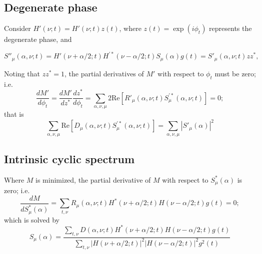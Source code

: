 \documentclass[manuscript]{aastex631}
\begin{document}


\subsection{Degenerate phase}
\label{sec:degenerate_phase}

\noindent

Consider $H'(\nu;t) = H'(\nu;t) z(t)$, where $z(t)=\exp(i\phi_t)$ represents the degenerate phase, and

\begin{equation}
    S''_\mu(\alpha,\nu;t) = H'(\nu+\alpha/2;t) H^{\prime *}(\nu-\alpha/2;t) S_\mu(\alpha) g(t) = S'_\mu(\alpha,\nu;t) zz^*,
\end{equation}

Noting that $zz^*=1$, the partial derivatives of $M'$ with respect to $\phi_t$ must be zero; i.e.
\begin{equation}
    \frac{dM'}{d\phi_t} = \frac{dM'}{dz^*}\frac{dz^*}{d\phi_t}
    = \sum_{\alpha,\nu,\mu} 2\mathrm{Re} \left[
    R'_\mu(\alpha,\nu;t) S^{\prime *}_\mu(\alpha,\nu;t) \right] = 0;
\label{eqn:dM_dphi}
\end{equation}
that is
\begin{equation}
\sum_{\alpha,\nu,\mu} \mathrm{Re} \left[D_\mu(\alpha,\nu;t) S^{\prime *}_\mu(\alpha,\nu;t) \right] =
\sum_{\alpha,\nu,\mu} |S'_\mu(\alpha)|^2
\end{equation}




\subsection{Intrinsic cyclic spectrum}
\label{sec:intrinsic_cyclic_spectrum}

\noindent
Where $M$ is minimized, the partial derivative of $M$ with respect to $S_\mu^*(\alpha)$ is zero; i.e.
\begin{equation}
    \frac{dM}{dS_\mu^*(\alpha)}
    = \sum_{t,\nu}
    R_\mu(\alpha,\nu;t) H^*(\nu+\alpha/2;t) H(\nu-\alpha/2;t) g(t) = 0;
\label{eqn:dM_dSx}
\end{equation}
which is solved by
\begin{equation}
S_\mu(\alpha) = \frac
{\sum_{t,\nu} D(\alpha,\nu;t) H^*(\nu+\alpha/2;t) H(\nu-\alpha/2;t) g(t)}
{\sum_{t,\nu} |H(\nu+\alpha/2;t)|^2 |H(\nu-\alpha/2;t)|^2 g^2(t)}
\label{eqn:ml_intrinsic}
\end{equation}
\end{document}
